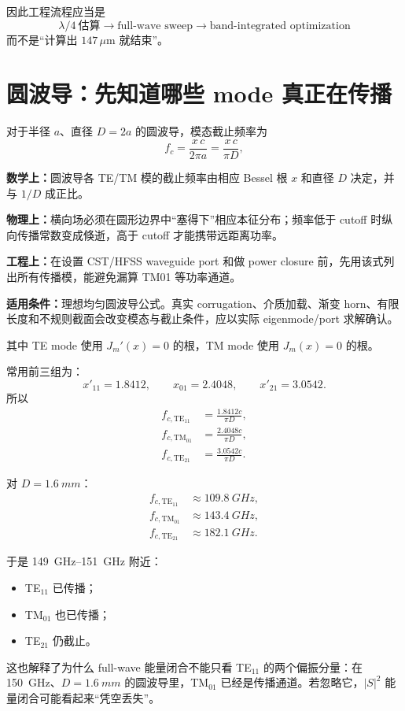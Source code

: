 \documentclass[11pt,a4paper,openany]{ctexrep}
\newcommand{\formulaexplain}[4]{%
\begin{formulaguidebox}
\textbf{\color{KidBlue}数学上：}#1\par
\textbf{\color{KidTeal}物理上：}#2\par
\textbf{\color{KidGold!55!black}工程上：}#3\par
\textbf{\color{KidRed}适用条件：}#4
\end{formulaguidebox}%
}
\begin{document}
因此工程流程应当是
\[
\boxed{
\lambda/4\ \text{估算}
\rightarrow
\text{full-wave sweep}
\rightarrow
\text{band-integrated optimization}
}
\]
而不是“计算出 $147\,\mu$m 就结束”。

\section{圆波导：先知道哪些 mode 真正在传播}

对于半径 $a$、直径 $D=2a$ 的圆波导，模态截止频率为
\[
f_c=\frac{x\,c}{2\pi a}=\frac{x\,c}{\pi D},
\]
\formulaexplain
{圆波导各 TE/TM 模的截止频率由相应 Bessel 根 $x$ 和直径 $D$ 决定，并与 $1/D$ 成正比。}
{横向场必须在圆形边界中“塞得下”相应本征分布；频率低于 cutoff 时纵向传播常数变成倏逝，高于 cutoff 才能携带远距离功率。}
{在设置 CST/HFSS waveguide port 和做 power closure 前，先用该式列出所有传播模，能避免漏算 TM01 等功率通道。}
{理想均匀圆波导公式。真实 corrugation、介质加载、渐变 horn、有限长度和不规则截面会改变模态与截止条件，应以实际 eigenmode/port 求解确认。}
其中 TE mode 使用 $J_m'(x)=0$ 的根，TM mode 使用 $J_m(x)=0$ 的根。

常用前三组为：
\[
x'_{11}=1.8412,\qquad x_{01}=2.4048,\qquad x'_{21}=3.0542.
\]
所以
\[
\begin{aligned}
f_{c,\mathrm{TE}_{11}}&=\frac{1.8412c}{\pi D},\\
f_{c,\mathrm{TM}_{01}}&=\frac{2.4048c}{\pi D},\\
f_{c,\mathrm{TE}_{21}}&=\frac{3.0542c}{\pi D}.
\end{aligned}
\]

对 $D=\SI{1.6}{mm}$：
\[
\boxed{
\begin{aligned}
f_{c,\mathrm{TE}_{11}}&\approx\SI{109.8}{GHz},\\
f_{c,\mathrm{TM}_{01}}&\approx\SI{143.4}{GHz},\\
f_{c,\mathrm{TE}_{21}}&\approx\SI{182.1}{GHz}.
\end{aligned}}
\]

于是 \SIrange{149}{151}{GHz} 附近：
\begin{itemize}
  \item TE$_{11}$ 已传播；
  \item TM$_{01}$ 也已传播；
  \item TE$_{21}$ 仍截止。
\end{itemize}

\begin{projectbox}
这也解释了为什么 full-wave 能量闭合不能只看 TE$_{11}$ 的两个偏振分量：在 \SI{150}{GHz}、$D=\SI{1.6}{mm}$ 的圆波导里，TM$_{01}$ 已经是传播通道。若忽略它，$|S|^2$ 能量闭合可能看起来“凭空丢失”。
\end{projectbox}
\end{document}
